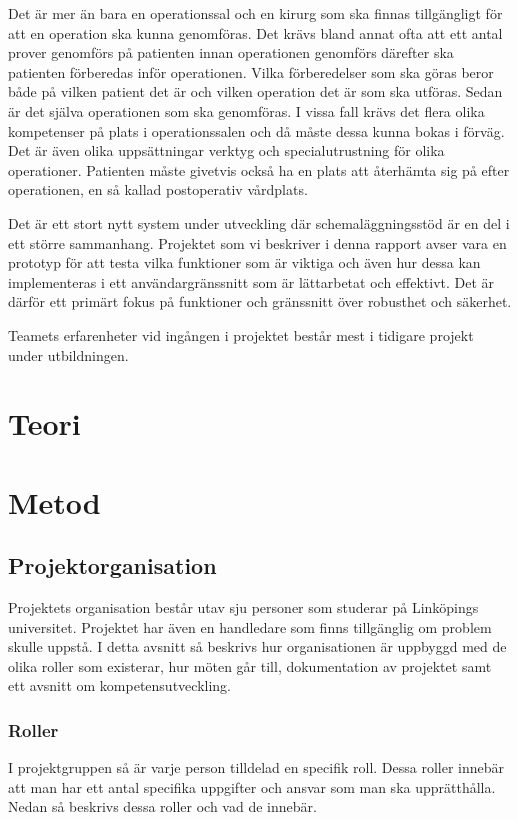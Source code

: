 \documentclass[a4paper,10pt]{article}
\begin{document}
Det är mer än bara en operationssal och en kirurg som ska finnas tillgängligt för att en operation ska kunna genomföras. Det krävs bland annat ofta att ett antal prover genomförs på patienten innan operationen genomförs därefter ska patienten förberedas inför operationen. Vilka förberedelser som ska göras beror både på vilken patient det är och vilken operation det är som ska utföras. Sedan är det själva operationen som ska genomföras. I vissa fall krävs det flera olika kompetenser på plats i operationssalen och då måste dessa kunna bokas i förväg. Det är även olika uppsättningar verktyg och specialutrustning för olika operationer.
Patienten måste givetvis också ha en plats att återhämta sig på efter operationen, en så kallad postoperativ vårdplats.

Det är ett stort nytt system under utveckling där schemaläggningsstöd är en del i ett större sammanhang. Projektet som vi beskriver i denna rapport avser vara en prototyp för att testa vilka funktioner som är viktiga och även hur dessa kan implementeras i ett användargränssnitt som är lättarbetat och effektivt. Det är därför ett primärt fokus på funktioner och gränssnitt över robusthet och säkerhet.

Teamets erfarenheter vid ingången i projektet består mest i tidigare projekt under utbildningen.

\section{Teori}

\section{Metod}

\subsection{Projektorganisation}
Projektets organisation består utav sju personer som studerar på Linköpings universitet. Projektet har även en handledare som finns tillgänglig om problem skulle uppstå. I detta avsnitt så beskrivs hur organisationen är uppbyggd med de olika roller som existerar, hur möten går till, dokumentation av projektet samt ett avsnitt om kompetensutveckling.

\subsubsection{Roller}
I projektgruppen så är varje person tilldelad en specifik roll. Dessa roller innebär att man har ett antal specifika uppgifter och ansvar som man ska upprätthålla. Nedan så beskrivs dessa roller och vad de innebär.
\end{document}
